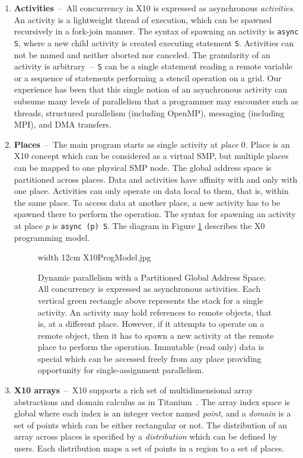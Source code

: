 \begin{enumerate}
\item{\bf Activities}~--~All concurrency in X10 is expressed as asynchronous {\em activities}. An activity is a lightweight thread of execution, which can be spawned recursively in a fork-join manner. The syntax of spawning an activity is {\tt async S}, where a new child activity is created executing statement {\tt S}. Activities can not be named and neither aborted nor canceled. The granularity of an activity is arbitrary~--~{\tt S} can be a single statement reading a remote variable or a sequence of statements performing a stencil operation on a grid.  Our experience has been that this single notion of an asynchronous activity can subsume many levels of parallelism that  a programmer may encounter such as threads, structured parallelism (including OpenMP), messaging (including MPI), and DMA transfers.  
\item{\bf Places}~--~The main program starts as single activity at {\em place} 0. Place is an X10 concept which can be considered as a virtual SMP, but multiple places can be mapped to one physical SMP node. The global address space is partitioned across places. Data and activities have affinity with and only with one place. Activities can only operate on data local to them, that is, within the same place. To access data at another place, a new activity has to be spawned there to perform the operation. The syntax for spawning an activity at place $p$ is {\tt async (p) S}. The diagram in Figure \ref{fig 1} describes the X0 programming model.

\begin{figure}
        \begin{center}
        \pdfimage width 12cm {X10ProgModel.jpg}
        \caption{Dynamic parallelism with a Partitioned Global Address Space. All concurrency is expressed as asynchronous activities.  Each vertical green rectangle above represents the stack for a single activity. An activity may hold references to remote objects, that is, at a different place.  However, if it attempts to operate on a remote object, then it has to spawn a new activity at the remote place to perform the operation.  Immutable (read only) data is special which can be accessed freely from any place providing opportunity for single-assignment parallelism.} \label{fig 1}
        \end{center}
\end{figure}


\item{\bf X10 arrays}~--~X10 supports a rich set of multidimensional array abstractions and domain calculus as in Titanium~\cite{titaniumDoc}. The array index space is global where each index is an integer vector named {\em point}, and a {\em domain} is a set of points which can be either rectangular or not. The distribution of an array across places is specified by a {\em distribution} which can be defined by users. Each distribution maps a set of points in a region to a set of places. 


\end{enumerate}
